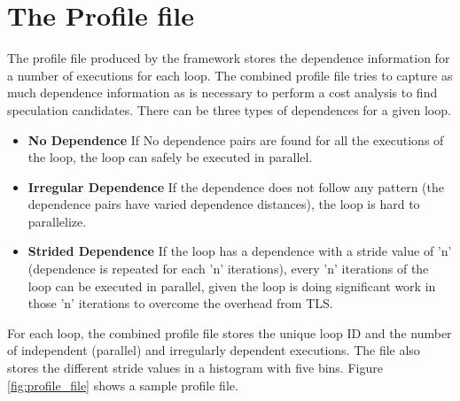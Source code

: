 \documentclass[10pt]{report}          %
\begin{document}
\section{The Profile file}

The profile file produced by the framework stores the dependence information for a number of executions for each loop. The combined profile file tries to capture as much dependence information as is necessary to perform a cost analysis to find speculation candidates.  There can be three types of dependences for a given loop.

\begin{itemize}
\item \textbf{No Dependence} If No dependence pairs are found for all the executions of the loop, the loop can safely be executed in parallel.
\item \textbf{Irregular Dependence} If the dependence does not follow any pattern (the dependence pairs have varied dependence distances), the loop is hard to parallelize.
\item \textbf{Strided Dependence} If the loop has a dependence with a stride value of 'n' (dependence is repeated for each 'n' iterations), every 'n' iterations of the loop can be executed in parallel, given the loop is doing significant work in those 'n' iterations to overcome the overhead from TLS.
\end{itemize} 

For each loop, the combined profile file stores the unique loop ID and the number of independent (parallel) and irregularly dependent executions.  The file also stores the different stride values in a histogram with five bins. 
Figure \ref{fig:profile_file} shows a sample profile file.\\
\end{document}
